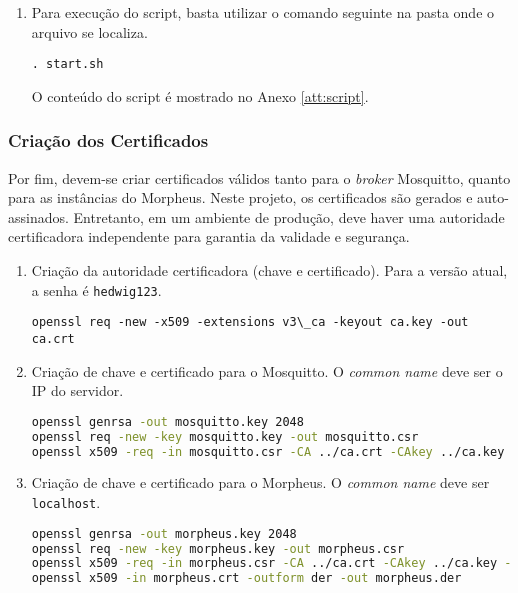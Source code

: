 \begin{enumerate}
\textbf{passwd}

\begin{lstlisting}[language=bash]
    0002D3D7:135876
    01344682:374028
    000750A1:524708
    001A1B07:321115
    0014BB3E:147203
    asd561asd5asd984faee:852456987
\end{lstlisting}

\item Para execução do script, basta utilizar o comando seguinte na pasta onde o arquivo se localiza.

\lstinline{. start.sh}

O conteúdo do script é mostrado no Anexo \ref{att:script}.
\end{enumerate}

\subsubsection{Criação dos Certificados}

Por fim, devem-se criar certificados válidos tanto para o \emph{broker} Mosquitto, quanto para as instâncias do Morpheus. Neste projeto, os certificados são gerados e auto-assinados. Entretanto, em um ambiente de produção, deve haver uma autoridade certificadora independente para garantia da validade e segurança.

\begin{enumerate}
\item
Criação da autoridade certificadora (chave e certificado). Para a versão atual, a senha é \texttt{hedwig123}.

\lstinline{openssl req -new -x509 -extensions v3\_ca -keyout ca.key -out ca.crt}
\item
Criação de chave e certificado para o Mosquitto. O \emph{common name} deve ser o IP do servidor.

\begin{lstlisting}[language=bash]
openssl genrsa -out mosquitto.key 2048
openssl req -new -key mosquitto.key -out mosquitto.csr
openssl x509 -req -in mosquitto.csr -CA ../ca.crt -CAkey ../ca.key -CAcreateserial -out mosquitto.crt -days 3650 -sha256
\end{lstlisting}

\item
Criação de chave e certificado para o Morpheus. O \emph{common name} deve ser \texttt{localhost}.

\begin{lstlisting}[language=bash]
openssl genrsa -out morpheus.key 2048
openssl req -new -key morpheus.key -out morpheus.csr
openssl x509 -req -in morpheus.csr -CA ../ca.crt -CAkey ../ca.key -CAcreateserial -out morpheus.crt -days 3650 -sha256 -addtrust clientAuth
openssl x509 -in morpheus.crt -outform der -out morpheus.der
\end{lstlisting}
\end{enumerate}

